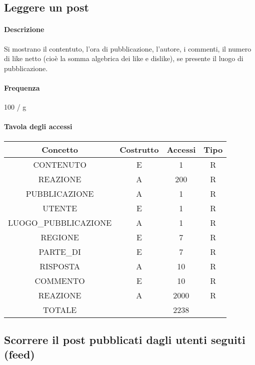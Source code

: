 \documentclass[a4paper,12pt]{report}
\begin{document}
\subsection{Leggere un post} \label{leggere_post}
\paragraph{Descrizione} Si mostrano il contentuto, l'ora di pubblicazione, l'autore, i commenti, il numero di like netto (cioè la somma algebrica dei like e dislike), se presente il luogo di pubblicazione.
\paragraph{Frequenza} 100 / g
\begin{table}[H]
\paragraph{Tavola degli accessi\newline}
\begin{tabular}{|c|c|c|c|}
\hline
Concetto             & Costrutto & Accessi & Tipo \\ \hline
CONTENUTO            & E         & 1       & R    \\ \hline
REAZIONE             & A         & 200     & R    \\ \hline
PUBBLICAZIONE        & A         & 1       & R    \\ \hline
UTENTE               & E         & 1       & R    \\ \hline
LUOGO\_PUBBLICAZIONE & A         & 1       & R    \\ \hline
REGIONE              & E         & 7       & R    \\ \hline
PARTE\_DI            & E         & 7       & R    \\ \hline
RISPOSTA             & A         & 10      & R    \\ \hline
COMMENTO             & E         & 10      & R    \\ \hline
REAZIONE             & A         & 2000    & R    \\ \hline
TOTALE               &           & 2238    &      \\ \hline
\end{tabular}
\end{table}
\subsection{Scorrere il post pubblicati dagli utenti seguiti (feed)} \label{feed}
\end{document}
